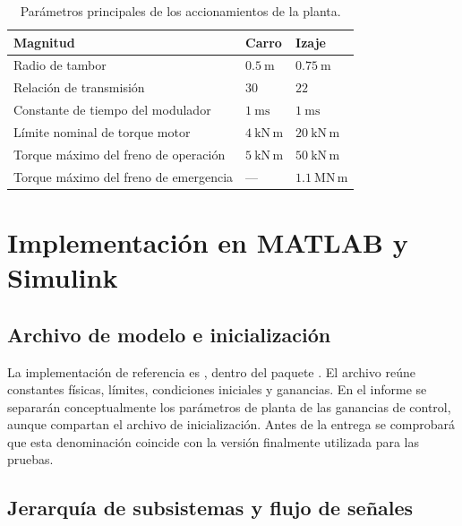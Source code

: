 \documentclass[a4paper,10pt,onecolumn,journal]{ieeeconf}
\numberwithin{equation}{section}
\begin{document}
	\begin{table}[!htb]
		\centering
		\caption{Parámetros principales de los accionamientos de la planta.}
		\begin{tabular}{L{5.6cm} C{3.0cm} C{3.5cm}}
			\toprule
			Magnitud & Carro & Izaje\\
			\midrule
			Radio de tambor & $0.5~\mathrm{m}$ & $0.75~\mathrm{m}$\\
			Relación de transmisión & $30$ & $22$\\
			Constante de tiempo del modulador & $1~\mathrm{ms}$ & $1~\mathrm{ms}$\\
			Límite nominal de torque motor & $4~\mathrm{kN\,m}$ & $20~\mathrm{kN\,m}$\\
			Torque máximo del freno de operación & $5~\mathrm{kN\,m}$ & $50~\mathrm{kN\,m}$\\
			Torque máximo del freno de emergencia & --- & $1.1~\mathrm{MN\,m}$\\
			\bottomrule
		\end{tabular}
		\label{tab:parametros_accionamientos}
	\end{table}

\par
{}
\section{Implementación en MATLAB y Simulink}
\label{sec:implementacion_planta}
	
	
	\subsection{Archivo de modelo e inicialización}
	La implementación de referencia es , dentro del paquete . El archivo  reúne constantes físicas, límites, condiciones iniciales y ganancias. En el informe se separarán conceptualmente los parámetros de planta de las ganancias de control, aunque compartan el archivo de inicialización. Antes de la entrega se comprobará que esta denominación coincide con la versión finalmente utilizada para las pruebas.
	
	
	\subsection{Jerarquía de subsistemas y flujo de señales}
\end{document}
